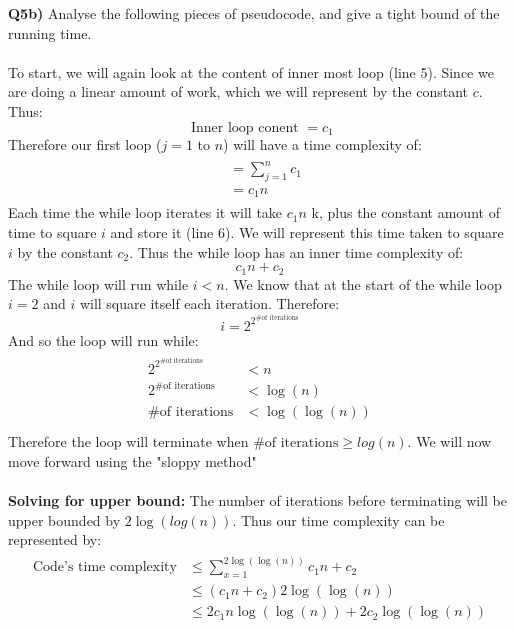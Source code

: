 \documentclass[12pt]{article}
\begin{document}
\newpage
\begin{adjustwidth}{0em}{0pt}
\textbf{Q5b)} Analyse the following pieces of pseudocode, and give a tight bound of the running time. \\ \\
To start, we will again look at the content of inner most loop (line 5). Since we are doing a linear amount of work, which we will represent by the constant $c$. Thus:
\[ \text{ Inner loop conent } = c_1 \]
Therefore our first loop ($j = 1$ to $n$) will have a time complexity of:
\begin{align*}
    \begin{aligned}
       &= \sum^{n}_{j=1}c_1  \\
       &= c_1n
    \end{aligned}
\end{align*}
Each time the while loop iterates it will take $c_1n$ k, plus the constant amount of time to square $i$ and store it (line 6). We will represent this time taken to square $i$ by the constant $c_2$. Thus the while loop has an inner time complexity of:
\[ c_1n + c_2 \]
The while loop will run while $i < n$. We know that at the start of the while loop $i = 2$ and $i$ will square itself each iteration. Therefore:
\[ i = 2^{2^{\text{\# of iterations}}} \]
And so the loop will run while:
\begin{align*}
    \begin{aligned}
       2^{2^{\text{\# of iterations}}} &< n \\
       2^{\text{\# of iterations}} &< \log(n) \\
       {\text{\# of iterations}}&< \log(\log(n)) \\
    \end{aligned}
\end{align*}
Therefore the loop will terminate when $\text{\# of iterations} \geq log(n)$. We will now move forward using the "sloppy method" \\ \\
\textbf{Solving for upper bound:} The number of iterations before terminating will be upper bounded by $2\log(log(n))$. Thus our time complexity can be represented by:
\begin{align*}
    \begin{aligned}
       \text{Code's time complexity} &\leq \sum^{2\log(\log(n))}_{x=1}c_1n + c_2   \\
       &\leq (c_1n + c_2)2\log(\log(n)) \\
       &\leq 2c_1n\log(\log(n))+ 2c_2\log(\log(n))

\end{aligned}
\end{align*}
\end{adjustwidth}
\end{document}
